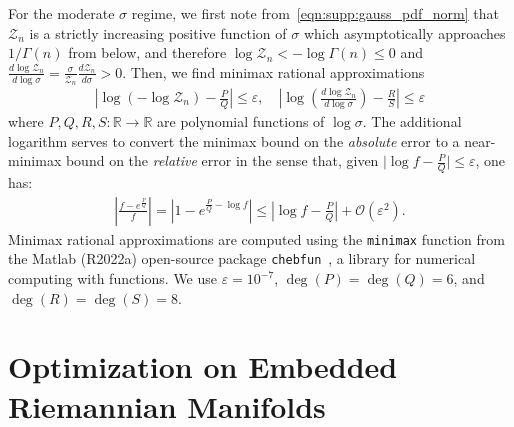 For the moderate $\sigma$ regime, we first note from~\eqref{eqn:supp:gauss_pdf_norm} that $\mathcal{Z}_n$ is a strictly increasing positive function of $\sigma$ which asymptotically approaches $1/\Gamma(n)$ from below, and therefore $\log\mathcal{Z}_n < -\log\Gamma(n) \le 0$ and $\frac{d \log\mathcal{Z}_n}{d \log\sigma} = \frac{\sigma}{\mathcal{Z}_n} \frac{d \mathcal{Z}_n}{d \sigma} > 0$.
Then, we find minimax rational approximations
\begin{align*}
    \left| \log\left( -\log\mathcal{Z}_n \right) - \frac{P}{Q} \right| \le \varepsilon, \quad \left| \log\left( \frac{d \log\mathcal{Z}_n}{d \log\sigma} \right) - \frac{R}{S} \right| \le \varepsilon
\end{align*}
where $P, Q, R, S : \mathbb{R} \to \mathbb{R}$ are polynomial functions of $\log\sigma$.
The additional logarithm serves to convert the minimax bound on the \textit{absolute} error to a near-minimax bound on the \textit{relative} error in the sense that, given $\lvert \log f - \frac{P}{Q} \rvert \le \varepsilon$, one has:
\begin{align*}
    \left|\frac{f - e^{\frac{P}{Q}}}{f}\right| = \left|1 - e^{\frac{P}{Q} - \log f}\right| \le \left|\log f - \frac{P}{Q}\right| + \mathcal{O}(\varepsilon^2).
\end{align*}
Minimax rational approximations are computed using the \texttt{minimax} function from the Matlab (R2022a) open-source package \texttt{chebfun}~\citep{driscoll_chebfun_2014}, a library for numerical computing with functions.
We use $\varepsilon = 10^{-7}$, $\deg(P) = \deg(Q) = 6$, and $\deg(R) = \deg(S) = 8$.

\section{Optimization on Embedded Riemannian Manifolds}\label{sec:supp:riemannian_optimization}

